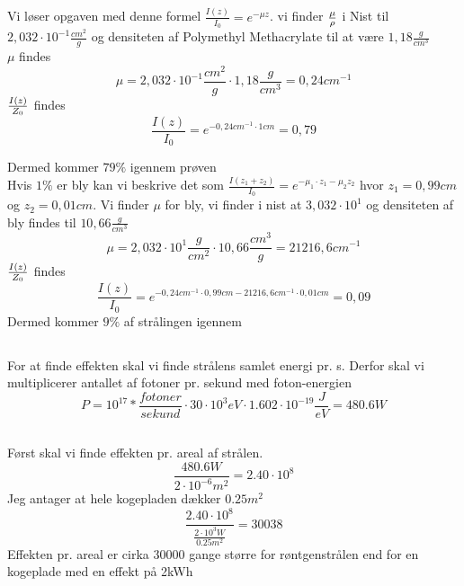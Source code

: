 \documentclass[a4paper,twoside]{article}
\begin{document}
\subsection{}
Vi løser opgaven med denne formel $\frac{I(z)}{I_0}=e^{-\mu z}$. vi finder $\mu\over\rho$ i Nist til $2,032\cdot 10^{-1} \frac{cm^2}{g}$ og densiteten af Polymethyl Methacrylate til at være $1,18\frac{g}{cm^3}$\\
$\mu$ findes
\begin{equation*}
    \mu=2,032\cdot10^{-1}\frac{cm^2}{g}\cdot1,18\frac{g}{cm^3}=0,24cm^{-1}
\end{equation*}
$I(z)\over Z_0$ findes
\begin{equation*}
    \frac{I(z)}{I_0}=e^{-0,24cm^{-1}\cdot 1cm}=0,79
\end{equation*}
 
    Dermed kommer $79\%$ igennem prøven\\
Hvis $1\%$ er bly kan vi beskrive det som $\frac{I(z_1+z_2)}{I_0}=e^{-\mu_1\cdot z_1-\mu_2 z_2}$ hvor $z_1=0,99cm$ og $z_2=0,01cm$. Vi finder $\mu$ for bly, vi finder i nist at $3,032\cdot10^1$ og densiteten af bly findes til $10,66\frac{g}{cm^3}$
\begin{equation*}
    \mu=2,032\cdot10^{1}\frac{g}{cm^2}\cdot10,66\frac{cm^3}{g}=21216,6cm^{-1}
\end{equation*}
$I(z)\over Z_0$ findes
\begin{equation*}
    \frac{I(z)}{I_0}=e^{-0,24cm^{-1}\cdot 0,99cm - 21216,6cm^{-1}\cdot 0,01cm}=0,09
\end{equation*}
Dermed kommer $9\%$ af strålingen igennem



\subsection{}
For at finde effekten skal vi finde strålens samlet energi pr. s. Derfor skal vi multiplicerer antallet af fotoner pr. sekund med foton-energien 
\begin{equation*}
P=10^{17}*\frac{fotoner}{sekund}\cdot30\cdot10^{3}eV\cdot1.602\cdot10^{-19} \frac{J}{eV}=480.6W
\end{equation*}
    
\subsection{}
Først skal vi finde effekten pr. areal af strålen. 
\begin{equation*}
    \frac{480.6W}{2\cdot10^{-6}m^2}=2.40\cdot10^{8}

\end{equation*}
Jeg antager at hele kogepladen dækker $0.25 m^2$
\begin{equation*}
    \frac{2.40\cdot10^{8}}{\frac{2\cdot10^3W}{0.25m^2}}=30038
\end{equation*}
Effekten pr. areal er cirka 30000 gange større for røntgenstrålen end for en kogeplade med en effekt på 2kWh
\end{document}
